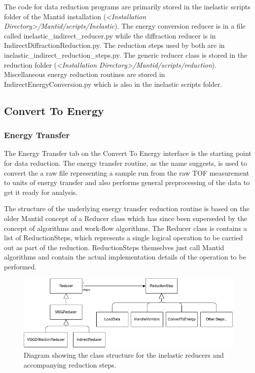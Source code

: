 \documentclass[paper=a4, fontsize=11pt]{scrartcl}	%
\numberwithin{equation}{section}															%
\numberwithin{figure}{section}																%
\numberwithin{table}{section}																%
\begin{document}
The code for data  reduction programs are primarily stored in the inelastic scripts folder of the Mantid installation (\textit{\textless Installation Directory\textgreater /Mantid/scripts/Inelastic}). The energy conversion reducer is in a file called inelastic\_indirect\_reducer.py while the diffraction reducer is in IndirectDiffractionReduction.py. The reduction steps used by both are in inelastic\_indirect\_reduction\_steps.py. The generic reducer class is stored in the reduction folder (\textit{\textless Installation Directory\textgreater/Mantid/scripts/reduction}). Miscellaneous energy reduction routines are stored in IndirectEnergyConversion.py which is also in the inelastic scripts folder.

\subsection{Convert To Energy}
\subsubsection{Energy Transfer}
\label{sec:energy-transfer}
The Energy Transfer tab on the Convert To Energy interface is the starting point for data reduction. The energy transfer routine, as the name suggests, is used to convert the a raw file representing a sample run from the raw TOF measurement to units of energy transfer and also performs general preprocessing of the data to get it ready for analysis.

The structure of the underlying energy transfer reduction routine is based on the older Mantid concept of a Reducer class which has since been superseded by the concept of algorithms and work-flow algorithms. The Reducer class is contains a list of ReductionSteps, which represents a single logical operation to be carried out as part of the reduction. ReductionSteps themselves just call Mantid algorithms and contain the actual implementation details of the operation to be performed.

\begin{figure}[H]
\centering
\includegraphics[width=1\textwidth]{img/uml/class_diagrams/Reducer_structure.png}
\caption{Diagram showing the class structure for the inelastic reducers and accompanying reduction steps.}
\label{fig:reducer-structure-diagram}
\end{figure}
\end{document}
